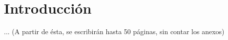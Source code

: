 \section{Introducción}
... (A partir de ésta, se escribirán hasta 50 páginas, sin contar los anexos)